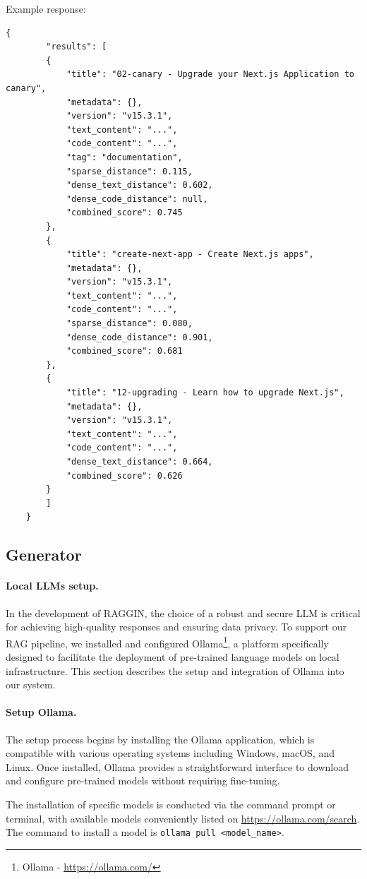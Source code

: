 Example response:

\begin{lstlisting}[caption=POST /search output example]
	{
		"results": [
		{
			"title": "02-canary - Upgrade your Next.js Application to canary",
			"metadata": {},
			"version": "v15.3.1",
			"text_content": "...",
			"code_content": "...",
			"tag": "documentation",
			"sparse_distance": 0.115,
			"dense_text_distance": 0.602,
			"dense_code_distance": null,
			"combined_score": 0.745
		},
		{
			"title": "create-next-app - Create Next.js apps",
			"metadata": {},
			"version": "v15.3.1",
			"text_content": "...",
			"code_content": "...",
			"sparse_distance": 0.080,
			"dense_code_distance": 0.901,
			"combined_score": 0.681
		},
		{
			"title": "12-upgrading - Learn how to upgrade Next.js",
			"metadata": {},
			"version": "v15.3.1",
			"text_content": "...",
			"code_content": "...",
			"dense_text_distance": 0.664,
			"combined_score": 0.626
		}
		]
	}
\end{lstlisting}

\subsection{Generator}

\paragraph*{Local LLMs setup.} In the development of RAGGIN, the choice of a robust and secure LLM is critical for achieving high-quality responses and ensuring data privacy. To support our RAG pipeline, we installed and configured Ollama\footnote{Ollama - \url{https://ollama.com/}}, a platform specifically designed to facilitate the deployment of pre-trained language models on local infrastructure. This section describes the setup and integration of Ollama into our system.

\paragraph*{Setup Ollama.} The setup process begins by installing the Ollama application, which is compatible with various operating systems including Windows, macOS, and Linux. Once installed, Ollama provides a straightforward interface to download and configure pre-trained models without requiring fine-tuning.

The installation of specific models is conducted via the command prompt or terminal, with available models conveniently listed on \url{https://ollama.com/search}.
The command to install a model is \verb|ollama pull <model_name>|.

